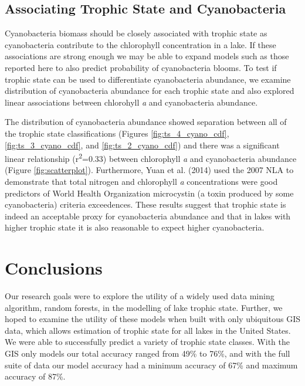 \documentclass[11pt,]{article}
\begin{document}
\subsection{Associating Trophic State and
Cyanobacteria}\label{associating-trophic-state-and-cyanobacteria}

Cyanobacteria biomass should be closely associated with trophic state as
cyanobacteria contribute to the chlorophyll concentration in a lake. If
these associations are strong enough we may be able to expand models
such as those reported here to also predict probability of cyanobacteria
blooms. To test if trophic state can be used to differentiate
cyanobacteria abundance, we examine distribution of cyanobacteria
abundance for each trophic state and also explored linear associations
between chlorohyll \emph{a} and cyanobacteria abundance.

The distribution of cyanobacteria abundance showed separation between
all of the trophic state classifications (Figures
\ref{fig:ts_4_cyano_cdf}, \ref{fig:ts_3_cyano_cdf}, and
\ref{fig:ts_2_cyano_cdf}) and there was a significant linear
relationship (r\textsuperscript{2}=0.33) between chlorophyll \emph{a}
and cyanobacteria abundance (Figure \ref{fig:scatterplot}). Furthermore,
Yuan et al. (2014) used the 2007 NLA to demonstrate that total nitrogen
and chlorophyll \emph{a} concentrations were good predictors of World
Health Organization microcystin (a toxin produced by some cyanobacteria)
criteria exceedences. These results suggest that trophic state is indeed
an acceptable proxy for cyanobacteria abundance and that in lakes with
higher trophic state it is also reasonable to expect higher
cyanobacteria.

\section{Conclusions}\label{conclusions}

Our research goals were to explore the utility of a widely used data
mining algorithm, random forests, in the modelling of lake trophic
state. Further, we hoped to examine the utility of these models when
built with only ubiquitous GIS data, which allows estimation of trophic
state for all lakes in the United States. We were able to successfully
predict a variety of trophic state classes. With the GIS only models our
total accuracy ranged from 49\% to 76\%, and with the full suite of data
our model accuracy had a minimum accuracy of 67\% and maximum accuracy
of 87\%.
\end{document}
